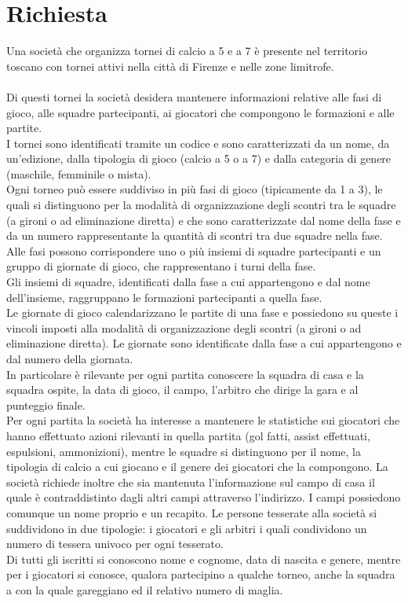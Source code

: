 \documentclass[11pt, openany]{article}
\theoremstyle{definition}
\theoremstyle{plain}
\theoremstyle{remark}
\begin{document}
	\part{Richiesta}
		Una società che organizza tornei di calcio a 5 e a 7 è presente nel territorio toscano con tornei attivi nella città di Firenze e nelle zone limitrofe.\\\\
		Di questi tornei la società desidera mantenere informazioni relative alle fasi di gioco, alle squadre partecipanti, ai giocatori che compongono le formazioni e alle partite.\\
		I tornei sono identificati tramite un codice e sono caratterizzati da un nome, da un’edizione, dalla tipologia di gioco (calcio a 5 o a 7) e dalla categoria di genere (maschile, femminile o mista).\\
		Ogni torneo può essere suddiviso in più fasi di gioco (tipicamente da 1 a 3), le quali si distinguono per la modalità di organizzazione degli scontri tra le squadre (a gironi o ad eliminazione diretta) e che sono caratterizzate dal nome della fase e da un numero rappresentante la quantità di scontri tra due squadre	nella fase. Alle fasi possono corrispondere uno o più insiemi di squadre partecipanti e un gruppo di
		giornate di gioco, che rappresentano i turni della fase.\\
		Gli insiemi di squadre, identificati dalla fase a cui appartengono e dal nome dell'insieme, raggruppano	le formazioni partecipanti a quella fase.\\
		Le giornate di gioco calendarizzano le partite di una fase e possiedono su queste i vincoli imposti alla modalità di organizzazione degli scontri (a gironi o ad eliminazione diretta). Le giornate sono identificate dalla fase a cui appartengono e dal numero della giornata.\\
		In particolare è rilevante per ogni partita conoscere la squadra di casa e la squadra ospite, la data di gioco, il campo, l’arbitro che dirige la gara e al punteggio finale.\\
		Per ogni partita la società ha interesse a mantenere le statistiche sui giocatori che hanno effettuato azioni rilevanti in quella partita (gol fatti, assist effettuati, espulsioni, ammonizioni), mentre le squadre si distinguono per il nome, la tipologia di calcio a cui giocano e il genere dei giocatori che la compongono.
		La società richiede inoltre che sia mantenuta l’informazione sul campo di casa il quale è contraddistinto dagli altri campi attraverso l’indirizzo. I campi possiedono comunque un nome proprio e un recapito.
		Le persone tesserate alla società si suddividono in due tipologie: i giocatori e gli arbitri i quali condividono un numero di tessera univoco per ogni tesserato.\\
		Di tutti gli iscritti si conoscono nome e cognome, data di nascita e genere, mentre per i giocatori si conosce, qualora partecipino a qualche torneo, anche la squadra a con la quale gareggiano ed il relativo numero di maglia.
	
\end{document}
